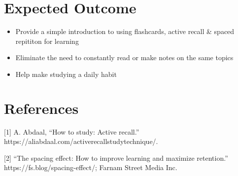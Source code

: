 \documentclass[a4paper]{article}
\begin{document}
\section{Expected Outcome}
\label{sec:org179fe13}
\begin{itemize}
\item Provide a simple introduction to using flashcards,  active recall \& spaced repititon for learning
\item Eliminate the need to constantly read or make notes on the same topics
\item Help make studying a daily habit
\end{itemize}
\section{References}
\label{sec:orgdbf4c19}
\hypertarget{citeproc_bib_item_1}{[1] A. Abdaal, “How to study: Active recall.” https://aliabdaal.com/activerecallstudytechnique/.}

\hypertarget{citeproc_bib_item_2}{[2] “The spacing effect: How to improve learning and maximize retention.” https://fs.blog/spacing-effect/; Farnam Street Media Inc.}\bigskip
\end{document}

